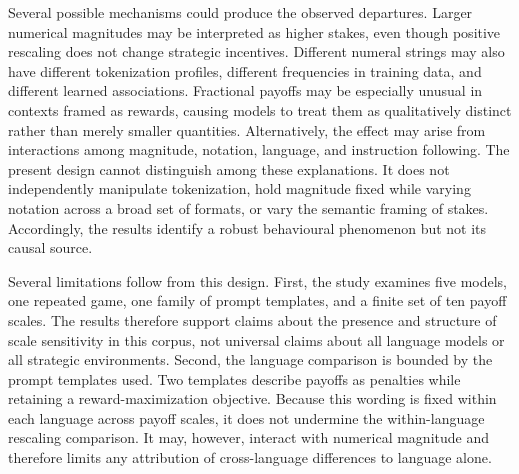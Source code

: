 \documentclass[11pt,a4paper]{article}
\begin{document}
Several possible mechanisms could produce the observed departures. Larger numerical magnitudes may be interpreted as higher stakes, even though positive rescaling does not change strategic incentives. Different numeral strings may also have different tokenization profiles, different frequencies in training data, and different learned associations. 
Fractional payoffs may be especially unusual in contexts framed as rewards, causing models to treat them as qualitatively distinct rather than merely smaller quantities. Alternatively, the effect may arise from interactions among magnitude, notation, language, and instruction following. 
The present design cannot distinguish among these explanations. It does not independently manipulate tokenization, hold magnitude fixed while varying notation across a broad set of formats, or vary the semantic framing of stakes. Accordingly, the results identify a robust behavioural phenomenon but not its causal source.

Several limitations follow from this design. First, the study examines five models, one repeated game, one family of prompt templates, and a finite set of ten payoff scales. The results therefore support claims about the presence and structure of scale sensitivity in this corpus, not universal claims about all language models or all strategic environments. Second, the language comparison is bounded by the prompt templates used. Two templates describe payoffs as penalties while retaining a reward-maximization objective. Because this wording is fixed within each language across payoff scales, it does not undermine the within-language rescaling comparison. It may, however, interact with numerical magnitude and therefore limits any attribution of cross-language differences to language alone.

\end{document}

